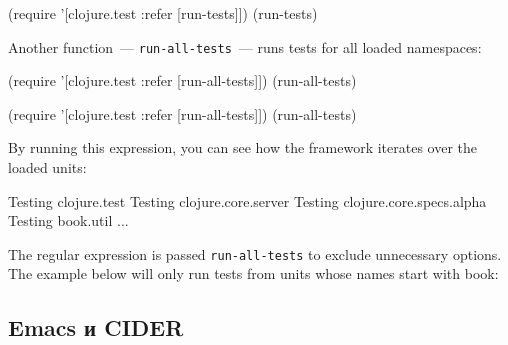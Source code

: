 \else

\begin{english}
  \begin{clojure}
(require '[clojure.test :refer [run-tests]])
(run-tests)
  \end{clojure}
\end{english}

\fi

Another function~--- \verb|run-all-tests|~--- runs tests for all loaded namespaces:

\ifx\DEVICETYPE\MOBILE

\begin{english}
  \begin{clojure}
(require
  '[clojure.test :refer [run-all-tests]])
(run-all-tests)
  \end{clojure}
\end{english}

\else

\begin{english}
  \begin{clojure}
(require '[clojure.test :refer [run-all-tests]])
(run-all-tests)
  \end{clojure}
\end{english}

\fi

By running this expression, you can see how the framework iterates over the loaded units:

\begin{english}
  \begin{text}
Testing clojure.test
Testing clojure.core.server
Testing clojure.core.specs.alpha
Testing book.util
...
  \end{text}
\end{english}


The regular expression is passed \verb|run-all-tests| to exclude unnecessary options. The example below will only run tests from units whose names start with book:

\begin{english}
\end{english}

\subsection{Emacs и CIDER}

